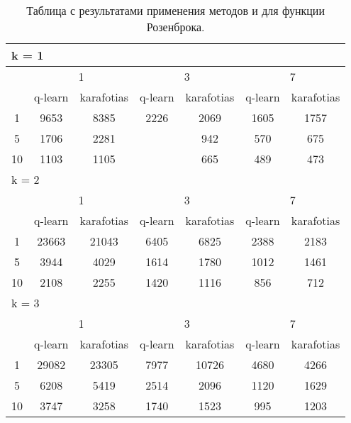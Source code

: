 \begin{table}
\centering
  \begin{tabular}{|*7{c|}}
    \hline
    \multicolumn{7}{|l|}{k = 1} \\
    \hline
    \multirow{2}{*}{\diagbox{$\mu$}{$\lambda$}} & \multicolumn{2}{c|}{1} & \multicolumn{2}{c|}{3} & \multicolumn{2}{c|}{7} \\
    \cline{2-7}
    & q-learn & karafotias & q-learn & karafotias & q-learn & karafotias \\
    \hline
    1 & 9653 & 8385 & 2226& 2069& 1605 & 1757 \\
    \hline
    5 & 1706 & 2281& \cellcolor{olive}{894} & 942 & 570 & 675 \\
    \hline
    10 & 1103 & 1105& \cellcolor{olive}{604} & 665 & 489 & 473 \\
    \hline
    \multicolumn{7}{|l|}{k = 2} \\
    \hline
    \multirow{2}{*}{\diagbox{$\mu$}{$\lambda$}} & \multicolumn{2}{c|}{1} & \multicolumn{2}{c|}{3} & \multicolumn{2}{c|}{7} \\
    \cline{2-7}
    & q-learn & karafotias & q-learn & karafotias & q-learn & karafotias \\
    \hline
    1 & 23663 & 21043 & 6405 & 6825 & 2388 & 2183 \\
    \hline
    5 & 3944 & 4029 & 1614 & 1780 & 1012 & 1461 \\
    \hline
    10 & 2108 & 2255 & 1420 & 1116 & 856 & 712 \\
    \hline
    \multicolumn{7}{|l|}{k = 3} \\
    \hline
    \multirow{2}{*}{\diagbox{$\mu$}{$\lambda$}} & \multicolumn{2}{c|}{1} & \multicolumn{2}{c|}{3} & \multicolumn{2}{c|}{7} \\
    \cline{2-7}
    & q-learn & karafotias & q-learn & karafotias & q-learn & karafotias \\
    \hline
    1 & 29082 & 23305 & 7977 & 10726 & 4680 & 4266 \\
    \hline
    5 & 6208 & 5419 & 2514 & 2096 & 1120 & 1629 \\
    \hline
    10 & 3747 & 3258 & 1740 & 1523 & 995 & 1203 \\
    \hline
  \end{tabular}
  \captionsetup{justification=centering}
  \caption{Таблица с результатами применения методов  и  для функции Розенброка.}
\end{table}

